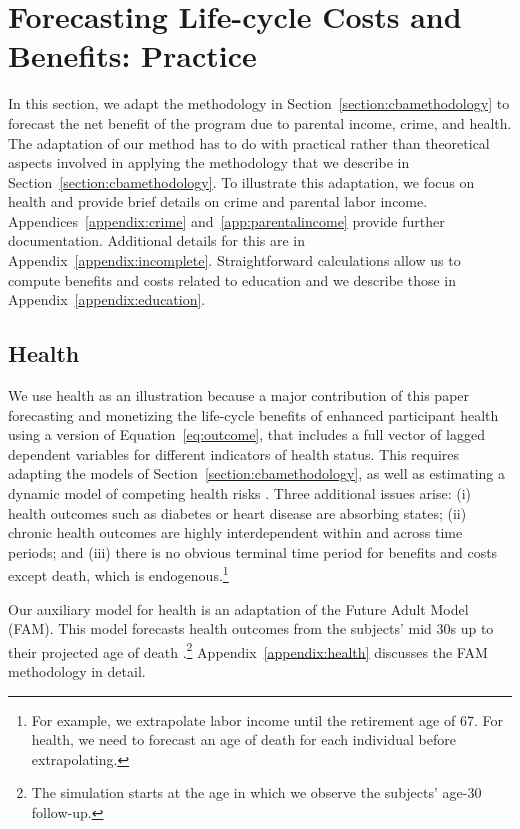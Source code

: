 \section{Forecasting Life-cycle Costs and Benefits: Practice} \label{section:cbapractice}

In this section, we adapt the methodology in Section~\ref{section:cbamethodology} to forecast the net benefit of the program due to parental income, crime, and health. The adaptation of our method has to do with practical rather than theoretical aspects involved in applying the methodology that we describe in Section~\ref{section:cbamethodology}. To illustrate this adaptation, we focus on health and provide brief details on crime and parental labor income. Appendices~\ref{appendix:crime} and~\ref{app:parentalincome} provide further documentation. Additional details for this are in Appendix~\ref{appendix:incomplete}. Straightforward calculations allow us to compute benefits and costs related to education and we describe those in Appendix~\ref{appendix:education}.

\subsection{Health}

We use health as an illustration because a major contribution of this paper forecasting and monetizing the life-cycle benefits of enhanced participant health using a version of Equation~\eqref{eq:outcome}, that includes a full vector of lagged dependent variables for different indicators of health status. This requires adapting the models of Section~\ref{section:cbamethodology}, as well as estimating a dynamic model of competing health risks \citep{Kalbfleisch_Prentice_1980_failure}. Three additional issues arise: (i) health outcomes such as diabetes or heart disease are absorbing states; (ii) chronic health outcomes are highly interdependent within and across time periods; and (iii) there is no obvious terminal time period for benefits and costs except death, which is endogenous.\footnote{For example, we extrapolate labor income until the retirement age of 67. For health, we need to forecast an age of death for each individual before extrapolating.}

Our auxiliary model for health is an adaptation of the Future Adult Model (FAM). This model forecasts health outcomes from the subjects' mid 30s up to their projected age of death \citep{Goldman_etal_2015_Future-Elderly-Model-Report}.\footnote{The simulation starts at the age in which we observe the subjects' age-30 follow-up.}  Appendix~\ref{appendix:health} discusses the FAM methodology in detail.

